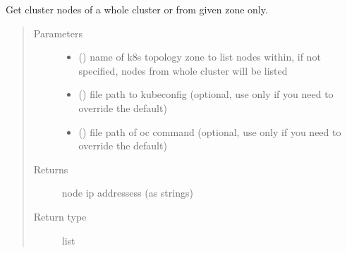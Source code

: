 \documentclass[letterpaper,10pt,english]{sphinxmanual}
\begin{document}
\begin{fulllineitems}
\label{\detokenize{ocpnetsplit:ocpnetsplit.ocp.list_cluster_nodes}}
Get cluster nodes of a whole cluster or from given zone only.
\begin{quote}\begin{description}
\item[{Parameters}] \leavevmode\begin{itemize}
\item {} 
 () \textendash{} name of k8s topology zone to list nodes within, if not
specified, nodes from whole cluster will be listed

\item {} 
 () \textendash{} file path to kubeconfig (optional, use only if you
need to override the default)

\item {} 
 () \textendash{} file path of oc command (optional, use only if
you need to override the default)

\end{itemize}

\item[{Returns}] \leavevmode
node ip addressess (as strings)

\item[{Return type}] \leavevmode
list

\end{description}\end{quote}

\end{fulllineitems}

\end{document}

